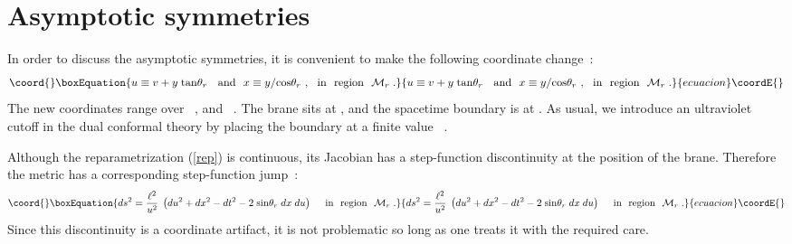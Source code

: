 \documentclass[a4paper,12pt,oneside]{article}
\begin{document}

\setcounter{equation}{0}
\section{Asymptotic symmetries}

   In order to discuss the asymptotic symmetries, it is convenient
to make the following coordinate change~:
\begin{equation}\coord{}\boxEquation{
  u  \equiv  v +  y\;{\rm tan}\theta_r  \;  \ \ {\rm and} \ \
 x \equiv y/{\rm cos}\theta_r  \ ,  
\ \ {\rm in\ \  region}\ \  {\cal M}_r\; .
\label{rep} 
}{
  u  \equiv  v +  y\;{\rm tan}\theta_r  \;  \ \ {\rm and} \ \
 x \equiv y/{\rm cos}\theta_r  \ ,  
\ \ {\rm in\ \  region}\ \  {\cal M}_r\; .
}{ecuacion}\coordE{}\end{equation}
The new coordinates range
over \coordHE{}~,  and \coordHE{}~.
The  brane sits at \coordHE{}, and  the spacetime boundary is at \coordHE{}.
As usual, we  introduce an  ultraviolet cutoff in the dual 
conformal theory
by placing the boundary at a finite 
value  \coordHE{}~.


Although the reparametrization (\ref{rep})  is continuous,  
its Jacobian has a step-function discontinuity at the position of
the brane. Therefore the metric has a corresponding 
step-function jump~:  
\begin{equation}\coord{}\boxEquation{
ds^2 = {\ell^2\over u^2}\; \left( du^2 +dx^2 -dt^2
  -2 \;  {\rm sin}\theta_{r}\; dx\; du \right) \    \ 
\ \ {\rm in\ \  region}\ \  {\cal M}_r\; . 
\label{metr}
}{
ds^2 = {\ell^2\over u^2}\; \left( du^2 +dx^2 -dt^2
  -2 \;  {\rm sin}\theta_{r}\; dx\; du \right) \    \ 
\ \ {\rm in\ \  region}\ \  {\cal M}_r\; . 
}{ecuacion}\coordE{}\end{equation}
\vskip 0.15cm 
\noindent 
Since this discontinuity is a coordinate artifact,  it is not problematic
so long as one treats it with the required  care. 
\end{document}
